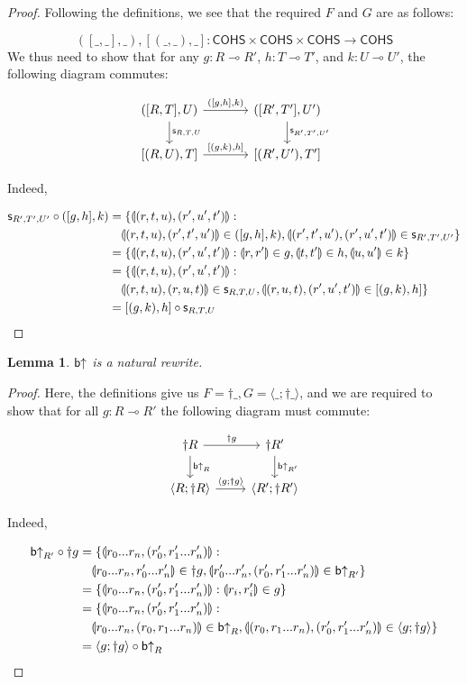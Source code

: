 \documentclass[11pt, oneside]{article}
\theoremstyle{plain}
\newtheorem{lemma}[theorem]{Lemma}
\theoremstyle{definition}
\let\originaldagger\dagger
\renewcommand{\dag}{\mathord{\originaldagger}}
\newcommand{\la}{\langle}
\newcommand{\ra}{\rangle}
\newcommand{\lp}{\llparenthesis}
\newcommand{\rp}{\rrparenthesis}
\newcommand{\cohs}{{\mathsf{COHS}}}
\newcommand{\comp}{\mathbin{\circ}}
\begin{document}
\begin{proof}
Following the definitions, we see that the required $F$ and $G$ are as follows:

$$([\_,\_],\_),[(\_,\_),\_]:\cohs\times\cohs\times\cohs\to\cohs$$
We thus need to show that for any $g:R\multimap R'$, $h:T\multimap T'$, and $k:U\multimap U'$, the following diagram commutes:

\[
\begin{tikzcd}[column sep = large]
    ([R,T],U) \arrow[r,"{([g,h],k)}"]\arrow[d,"\sw_{R,T,U}"]& ([R',T'],U') \arrow[d,"\sw_{R',T',U'}"] \\
    {[(R,U),T]} \arrow[r,"{[(g,k),h]}"] & {[(R',U'),T']}
\end{tikzcd}
\]

Indeed,

\begin{align*}
\sw_{R',T',U'}\comp ([g,h],k) &= \{\lp(r,t,u),(r',u',t')\rp: \\
&\quad\lp(r,t,u),(r',t',u')\rp\in([g,h],k),\lp(r',t',u'),(r',u',t')\rp\in \sw_{R',T',U'}\} \\
&= \{\lp(r,t,u),(r',u',t')\rp:\lp r,r'\rp\in g, \lp t,t'\rp\in h, \lp u,u'\rp\in k\} \\
&= \{\lp(r,t,u),(r',u',t')\rp: \\
&\quad\lp(r,t,u),(r,u,t)\rp\in \sw_{R,T,U},\lp(r,u,t),(r',u',t')\rp\in[(g,k),h]\} \\
&= [(g,k),h]\comp \sw_{R,T,U}
\end{align*}
\end{proof}

\begin{lemma}
${\mathsf b}{ \uparrow}$ is a natural rewrite.
\end{lemma}

\begin{proof}
Here, the definitions give us $F = \dag\_, G = \la\_;\dag\_\ra$, and we are required to show that for all $g:R\multimap R'$ the following diagram must commute:

\[
\begin{tikzcd}
    \dag R \arrow[r,"\dag g"]\arrow[d,"\bU_{R}"]& \dag R' \arrow[d,"\bU_{R'}"] \\
    \la R; \dag R\ra \arrow[r,"\la g;\dag g\ra"] & \la R';\dag R'\ra
\end{tikzcd}
\]

Indeed,

\begin{align*}
\bU_{R'}\comp\dag g &= \{\lp r_0...r_n,(r'_0,r'_1...r'_n)\rp: \\
&\quad\lp r_0...r_n,r'_0...r'_n\rp\in\dag g,\lp r'_0...r'_n,(r'_0,r'_1...r'_n)\rp\in\bU_{R'}\} \\
&= \{\lp r_0...r_n,(r'_0,r'_1...r'_n)\rp:\lp r_i,r'_i\rp\in g\} \\
&= \{\lp r_0...r_n,(r'_0,r'_1...r'_n)\rp: \\
&\quad\lp r_0...r_n,(r_0,r_1...r_n)\rp\in\bU_{R},\lp(r_0,r_1...r_n),(r'_0,r'_1...r'_n)\rp\in\la g;\dag g\ra\} \\
&= \la g;\dag g\ra\comp\bU_{R}
\end{align*}
\end{proof}
\end{document}
